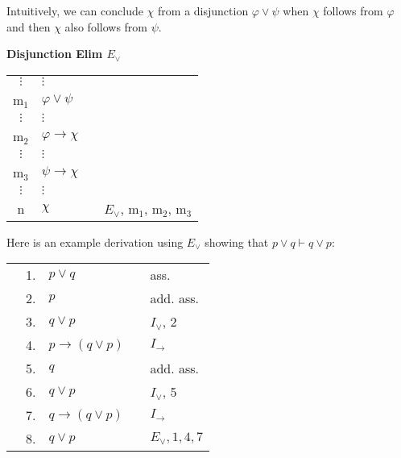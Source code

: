 \documentclass[nobib,nofonts]{tufte-handout}
\begin{document}
Intuitively, we can conclude $\chi$ from a disjunction $\varphi \vee \psi$ when $\chi$ follows from $\varphi$ and then $\chi$ also follows from $\psi$.

\bigskip
\noindent \colorbox{mygray!60}{\centering
  \begin{minipage}[t]{0.35\linewidth}
    \textbf{Disjunction Elim $E_{\vee}$}
  \end{minipage}
  \begin{minipage}[t]{0.55\linewidth}
    \begin{tabular}{clcl}
            $\vdots$ & $\vdots$                   & \\
      m$_{1}$        & $\varphi \vee \psi$        &  \\
            $\vdots$ & $\vdots$                   & \\
      m$_{2}$        & $\varphi \rightarrow \chi$ &  \\
            $\vdots$ & $\vdots$                   & \\
      m$_{3}$        & $\psi  \rightarrow \chi$   &  \\
            $\vdots$ & $\vdots$                   & \\
      n             & $\chi$                     & & $E_{\vee}$, m$_{1}$, m$_{2}$, m$_{3}$
    \end{tabular}
  \end{minipage}
}
\bigskip

Here is an example derivation using $E_{\vee}$ showing that $p \vee q \vdash q \vee p$:

\begin{tabular}{cclcl}
                     & 1. & $p \vee q$                  & & ass. \\
  \cline{1-2} \vline & 2. & $p$                         & & add. ass. \\
  \vline             & 3. & $q \vee p$                  & & $I_{\vee}$, 2  \\ \hline
                     & 4. & $p \rightarrow (q \vee p)$  & & $I_{\rightarrow}$  \\
  \cline{1-2} \vline & 5. & $q$                         & & add. ass. \\
  \vline             & 6. & $q \vee p$                  & & $I_{\vee}$, 5  \\ \hline
                     & 7. & $q \rightarrow (q \vee p) $ & & $I_{\rightarrow}$  \\
  & 8. & $q \vee p $ & & $E_{\vee}, 1, 4, 7$  \\
\end{tabular}
\end{document}
